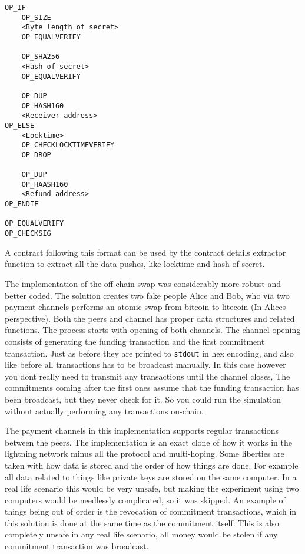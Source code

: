 \begin{verbatim}
OP_IF
    OP_SIZE
    <Byte length of secret>
    OP_EQUALVERIFY
    
    OP_SHA256
    <Hash of secret>
    OP_EQUALVERIFY
    
    OP_DUP
    OP_HASH160
    <Receiver address>
OP_ELSE
    <Locktime>
    OP_CHECKLOCKTIMEVERIFY
    OP_DROP
    
    OP_DUP
    OP_HAASH160
    <Refund address>
OP_ENDIF

OP_EQUALVERIFY
OP_CHECKSIG
\end{verbatim}

A contract following this format can be used by the contract details 
extractor function to extract all the data pushes, like locktime and 
hash of secret.

The implementation of the off-chain swap was considerably more robust and better coded.
The solution creates two fake people Alice and Bob, who via two payment channels performs
an atomic swap from bitcoin to litecoin (In Alices perspective). Both the peers and
channel has proper data structures  and related functions. The process starts with 
opening of both channels. The channel opening consists of generating the funding transaction 
and the first commitment transaction. Just as before they are printed to \texttt{stdout} 
in hex encoding, and also like before all transactions has to be broadcast manually. In
this case however you dont really need to transmit any transactions until the channel closes,
The commitments coming after the first ones assume that the funding transaction has been broadcast,
but they never check for it. So you could run the simulation without actually performing any transactions
on-chain.

The payment channels in this implementation supports regular transactions between the peers. The implementation
is an exact clone of how it works in the lightning network minus all the protocol and multi-hoping.
Some liberties are taken with how data is stored and the order of how things are done. For example 
all data related to things like private keys are stored on the same computer. In a real life scenario this
would be very unsafe, but making the experiment using two computers would be needlessly complicated, so
it was skipped. An example of things being out of order is the revocation of commitment transactions, which 
in this solution is done at the same time as the commitment itself. This is also completely unsafe 
in any real life scenario, all money would be stolen if any commitment transaction was broadcast. 


